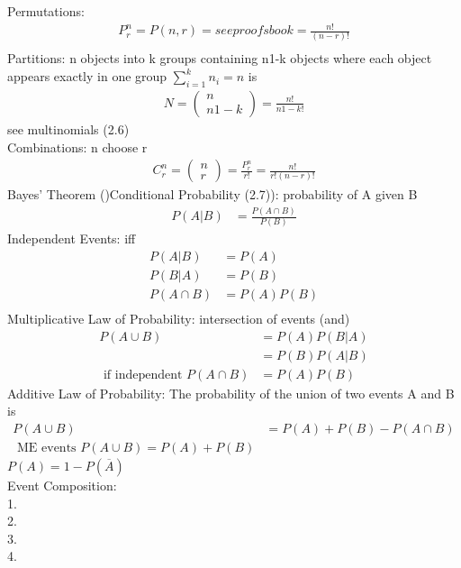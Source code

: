 \documentclass[12pt]{article}
\newcommand{\uu}{\overline}
\begin{document}
	Permutations:
	\begin{align*}
		P^n_r = P(n,r) = seeproofsbook = \frac{n!}{(n-r)!} \\
	\end{align*}
	Partitions: n objects into k groups containing n1-k objects where each
	object appears exactly in one group $ \sum^k_{i=1}n_i = n $ is
	\begin{align*}
		N = \begin{pmatrix} n \\ n1-k \end{pmatrix} = \frac{n!}{n1-k!} 
	\end{align*}
	see multinomials (2.6)\\
	Combinations: n choose r
	\begin{align*}
		C^n_r = \begin{pmatrix} n \\ r \end{pmatrix} = \frac{P^n_r}{r!} = \frac{n!}{r!(n-r)!} 
	\end{align*}
	Bayes' Theorem ()Conditional Probability (2.7)): probability of A given B
	\begin{align*}
		P(A|B) &= \frac{P(A \cap B)}{P(B)}
	\end{align*}
	Independent Events: iff
	\begin{align*}
		P(A|B) &= P(A) \\
		P(B|A) &= P(B) \\
		P(A \cap B ) &= P(A)P(B) \\
	\end{align*}
	Multiplicative Law of Probability: intersection of events (and)
	\begin{align*}
		P(A \cup B) &= P(A)P(B|A) \\
				 &= P(B)P(A|B) \\
		\text{ if independent } P(A \cap B) &= P(A)P(B)
	\end{align*}
	Additive Law of Probability: The probability of the union of two events A and B is
	\begin{align*}
		P(A \cup B) &= P(A) + P(B) - P(A \cap B) \\
		\text{ ME events } P(A \cup B) = P(A) + P(B)
	\end{align*}
	$ P(A) = 1 - P(\uu{A}) $ \\
	Event Composition: \\
	1. \\
	2. \\
	3. \\
	4. \\
\end{document}
